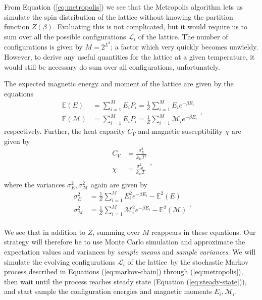 \documentclass[]{article}
\begin{document}
\vspace{5mm}

From Equation (\ref{eq:metropolis}) we see that the Metropolis algorithm lets us simulate the spin distribution of the lattice without knowing the partition function $Z(\beta)$. Evaluating this is not complicated, but it would require us to sum over all the possible configurations $\mathcal{L}_i$ of the lattice. The number of configurations is given by $M = 2^{L^2}$; a factor which very quickly becomes unwieldy. However, to derive any useful quantities for the lattice at a given temperature, it would still be necessary do sum over all configurations, unfortunately.

The expected magnetic energy and moment of the lattice are given by the equations
\begin{equation}
\begin{aligned}
	\mathbb{E}(E) &= \sum_{i=1}^{M} E_i P_i  = \frac{1}{Z} \sum_{i=1}^{M} E_i e^{-\beta E_i} \\
	\mathbb{E}(\mathcal{M}) &= \sum_{i=1}^{M} E_i P_i  = \frac{1}{Z} \sum_{i=1}^{M} \mathcal{M}_i e^{-\beta E_i}
\end{aligned},
\end{equation}
respectively. Further, the heat capacity $C_V$ and magnetic susceptibility $\chi$ are given by  
\begin{equation}
\begin{aligned}
	C_V &= \frac{\sigma^2_E}{k_B T^2} \\
	\chi &= \frac{\sigma^2_\mathcal{M}}{k_B T} \\
\end{aligned},
\end{equation}
where the variances $\sigma^2_E, \sigma^2_\mathcal{M}$ again are given by
\begin{equation}
\begin{aligned}
	\sigma^2_E &= \frac{1}{Z} \sum_{i=1}^{M} E^2_i e^{-\beta E_i} - \mathbb{E}^2(E) \\
	\sigma^2_\mathcal{M} &= \frac{1}{Z} \sum_{i=1}^{M} \mathcal{M}^2_i e^{-\beta E_i} - \mathbb{E}^2(\mathcal{M}) \\
\end{aligned}.
\end{equation}

We see that in addition to $Z$, summing over $M$ reappears in these equations. Our strategy will therefore be to use Monte Carlo simulation and approximate the expectation values and variances by \textit{sample means} and \textit{sample variances}. We will simulate the evolving configurations $\mathcal{L}_i$ of the lattice by the stochastic Markov process described in Equations (\ref{eq:markov-chain}) through (\ref{eq:metropolis}), then wait until the process reaches steady state (Equation (\ref{eq:steady-state})), and start sample the configuration energies and magnetic moments $E_i, \mathcal{M}_i$.
\end{document}
